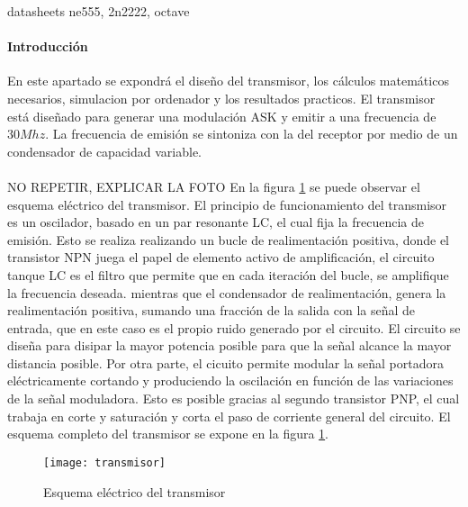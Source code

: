 datasheets ne555, 2n2222, octave
\paragraph{Introducci\'on}
En este apartado se expondr\'a el diseño del transmisor, los c\'alculos matem\'aticos necesarios, simulacion por ordenador y los resultados practicos.
El transmisor está diseñado para generar una modulación ASK y emitir a una frecuencia de $30Mhz$. La frecuencia de emisión se sintoniza con la del receptor por medio de un condensador de capacidad variable.
\paragraph{}
NO REPETIR, EXPLICAR LA FOTO
En la figura \ref{fig:tx} se puede observar el esquema eléctrico del transmisor.
El principio de funcionamiento del transmisor es un oscilador, basado en un par resonante LC, el cual fija la frecuencia de emisión. Esto se realiza realizando un bucle de realimentación positiva, donde el transistor NPN juega el papel de elemento activo de amplificación, el circuito tanque LC es el filtro que permite que en cada iteración del bucle, se amplifique la frecuencia deseada. mientras que el condensador de realimentación, genera la realimentación positiva, sumando una fracción de la salida con la señal de entrada, que en este caso es el propio ruido generado por el circuito.
El circuito se diseña para disipar la mayor potencia posible para que la señal alcance la mayor distancia posible. 
Por otra parte, el cicuito permite modular la señal portadora eléctricamente cortando y produciendo la oscilación en función de las variaciones de la señal moduladora. Esto es posible gracias al segundo transistor PNP, el cual trabaja en corte y saturaci\'on y corta el paso de corriente general del circuito.
El esquema completo del transmisor se expone en la figura \ref{fig:tx}.

\begin{figure}[h]
    \centering
    \texttt{[image: transmisor]}
    \caption{Esquema el\'ectrico del transmisor}
    \label{fig:tx}
\end{figure}


